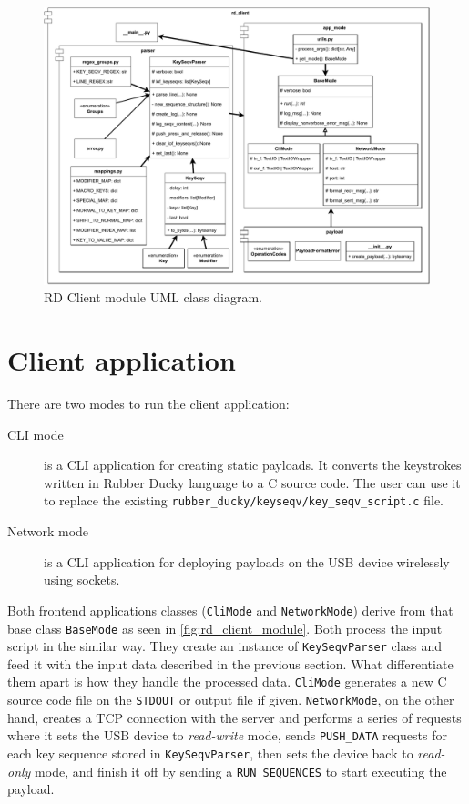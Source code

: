 \begin{figure}[ht]
    \centering
    \includegraphics[width=\linewidth]{./obrazky-figures/rd_client_module.pdf}
    \caption{RD Client module UML class diagram.}
    \label{fig:rd_client_module}
\end{figure}

\section{Client application}
\label{sec:implementation_client}
There are two modes to run the client application:
\begin{description}
    \item [CLI mode] is a CLI application for creating static payloads. It converts the keystrokes written in Rubber Ducky language to a C source code. The user can use it to replace the existing \verb|rubber_ducky/keyseqv/key_seqv_script.c| file.
    \item [Network mode] is a CLI application for deploying payloads on the USB device wirelessly using sockets.
\end{description}
Both frontend applications classes (\verb|CliMode| and \verb|NetworkMode|) derive from that base class \verb|BaseMode| as seen in \autoref{fig:rd_client_module}. Both process the input script in the similar way. They create an instance of \verb|KeySeqvParser| class and feed it with the input data described in the previous section. What differentiate them apart is how they handle the processed data. \verb|CliMode| generates a new C source code file on the \verb|STDOUT| or output file if given. \verb|NetworkMode|, on the other hand, creates a TCP connection with the server and performs a series of requests where it sets the USB device to \emph{read-write} mode, sends \verb|PUSH_DATA| requests for each key sequence stored in \verb|KeySeqvParser|, then sets the device back to \emph{read-only} mode, and finish it off by sending a \verb|RUN_SEQUENCES| to start executing the payload.

